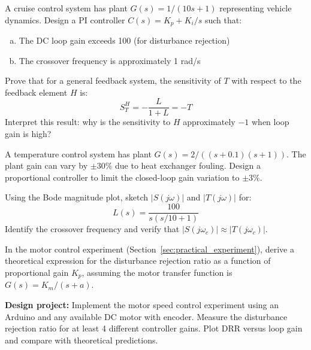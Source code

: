 \begin{exercise}
A cruise control system has plant $G(s) = 1/(10s+1)$ representing vehicle dynamics. Design a PI controller $C(s) = K_p + K_i/s$ such that:
\begin{enumerate}[(a)]
    \item The DC loop gain exceeds 100 (for disturbance rejection)
    \item The crossover frequency is approximately 1 rad/s
\end{enumerate}
\end{exercise}

\begin{exercise}
Prove that for a general feedback system, the sensitivity of $T$ with respect to the feedback element $H$ is:
\begin{equation}
S^H_T = -\frac{L}{1+L} = -T
\end{equation}
Interpret this result: why is the sensitivity to $H$ approximately $-1$ when loop gain is high?
\end{exercise}

\begin{exercise}
A temperature control system has plant $G(s) = 2/((s+0.1)(s+1))$. The plant gain can vary by $\pm 30\%$ due to heat exchanger fouling. Design a proportional controller to limit the closed-loop gain variation to $\pm 3\%$.
\end{exercise}

\begin{exercise}
Using the Bode magnitude plot, sketch $|S(j\omega)|$ and $|T(j\omega)|$ for:
\begin{equation}
L(s) = \frac{100}{s(s/10 + 1)}
\end{equation}
Identify the crossover frequency and verify that $|S(j\omega_c)| \approx |T(j\omega_c)|$.
\end{exercise}

\begin{exercise}
In the motor control experiment (Section~\ref{sec:practical_experiment}), derive a theoretical expression for the disturbance rejection ratio as a function of proportional gain $K_p$, assuming the motor transfer function is $G(s) = K_m/(s + a)$.
\end{exercise}

\begin{exercise}
\textbf{Design project:} Implement the motor speed control experiment using an Arduino and any available DC motor with encoder. Measure the disturbance rejection ratio for at least 4 different controller gains. Plot DRR versus loop gain and compare with theoretical predictions.
\end{exercise}

